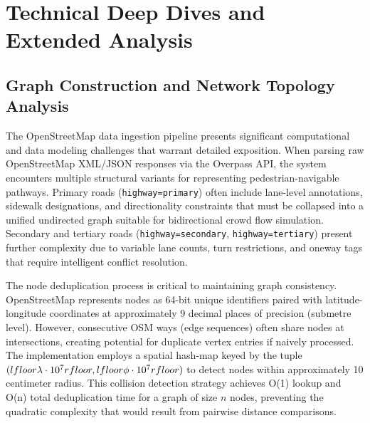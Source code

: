 \documentclass[12pt,a4paper,oneside]{report}
\begin{document}
\chapter{Technical Deep Dives and Extended Analysis}

\section{Graph Construction and Network Topology Analysis}
The OpenStreetMap data ingestion pipeline presents significant computational and data modeling challenges that warrant detailed exposition. When parsing raw OpenStreetMap XML/JSON responses via the Overpass API, the system encounters multiple structural variants for representing pedestrian-navigable pathways. Primary roads (\texttt{highway=primary}) often include lane-level annotations, sidewalk designations, and directionality constraints that must be collapsed into a unified undirected graph suitable for bidirectional crowd flow simulation. Secondary and tertiary roads (\texttt{highway=secondary}, \texttt{highway=tertiary}) present further complexity due to variable lane counts, turn restrictions, and oneway tags that require intelligent conflict resolution.

The node deduplication process is critical to maintaining graph consistency. OpenStreetMap represents nodes as 64-bit unique identifiers paired with latitude-longitude coordinates at approximately 9 decimal places of precision (submetre level). However, consecutive OSM ways (edge sequences) often share nodes at intersections, creating potential for duplicate vertex entries if naively processed. The implementation employs a spatial hash-map keyed by the tuple $(\\lfloor \lambda \cdot 10^7 \\rfloor, \\lfloor \phi \cdot 10^7 \\rfloor)$ to detect nodes within approximately 10 centimeter radius. This collision detection strategy achieves O(1) lookup and O(n) total deduplication time for a graph of size $n$ nodes, preventing the quadratic complexity that would result from pairwise distance comparisons.
\end{document}
